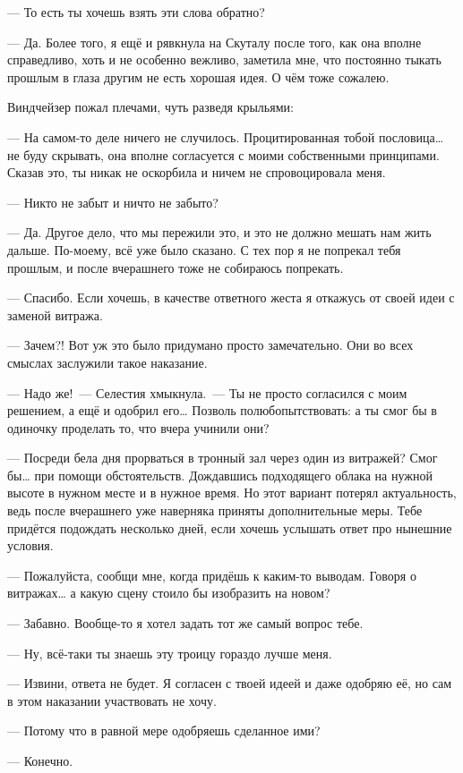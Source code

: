\documentclass[fontsize=11pt,a5paper,titlepage=firstcover]{scrbook}
\begin{document}
--- То есть ты хочешь взять эти слова обратно?

--- Да. Более того, я ещё и рявкнула на Скуталу после того, как она вполне справедливо, хоть и не особенно вежливо, заметила мне, что постоянно тыкать прошлым в глаза другим не есть хорошая идея. О чём тоже сожалею.

Виндчейзер пожал плечами, чуть разведя крыльями:

--- На самом-то деле ничего не случилось. Процитированная тобой пословица{\ldots} не буду скрывать, она вполне согласуется с моими собственными принципами. Сказав это, ты никак не оскорбила и ничем не спровоцировала меня.

--- Никто не забыт и ничто не забыто?

--- Да. Другое дело, что мы пережили это, и это не должно мешать нам жить дальше. По-моему, всё уже было сказано. С тех пор я не попрекал тебя прошлым, и после вчерашнего тоже не собираюсь попрекать.

--- Спасибо. Если хочешь, в качестве ответного жеста я откажусь от своей идеи с заменой витража.

--- Зачем?! Вот уж это было придумано просто замечательно. Они во всех смыслах заслужили такое наказание.

--- Надо же!~--- Селестия хмыкнула.~--- Ты не просто согласился с моим решением, а ещё и одобрил его{\ldots} Позволь полюбопытствовать: а ты смог бы в одиночку проделать то, что вчера учинили они?

--- Посреди бела дня прорваться в тронный зал через один из витражей? Смог бы{\ldots} при помощи обстоятельств. Дождавшись подходящего облака на нужной высоте в нужном месте и в нужное время. Но этот вариант потерял актуальность, ведь после вчерашнего уже наверняка приняты дополнительные меры. Тебе придётся подождать несколько дней, если хочешь услышать ответ про нынешние условия.

--- Пожалуйста, сообщи мне, когда придёшь к каким-то выводам. Говоря о витражах{\ldots} а какую сцену стоило бы изобразить на новом?

--- Забавно. Вообще-то я хотел задать тот же самый вопрос тебе.

--- Ну, всё-таки ты знаешь эту троицу гораздо лучше меня.

--- Извини, ответа не будет. Я согласен с твоей идеей и даже одобряю её, но сам в этом наказании участвовать не хочу.

--- Потому что в равной мере одобряешь сделанное ими?

--- Конечно.
\end{document}
